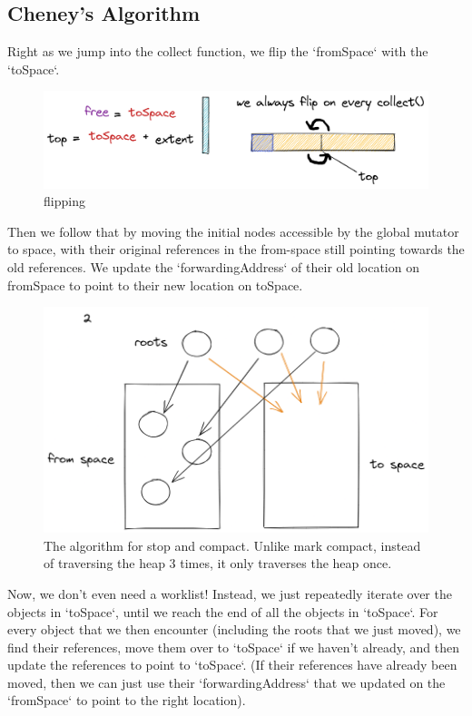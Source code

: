\documentclass[index]{subfiles}
\begin{document}
\subsection{Cheney's Algorithm}

Right as we jump into the collect function, we flip the `fromSpace` with the `toSpace`.

\begin{figure}[H]
    \centering
    \includegraphics[scale=0.3]{pics/flipping.png}
    \caption{flipping}
\end{figure}

Then we follow that by moving the initial nodes accessible by the global mutator to space, with their original references in the from-space still pointing towards the old references. We update the `forwardingAddress` of their old location on fromSpace to point to their new location on toSpace.

\begin{figure}[H]
    \centering
    \includegraphics[scale=0.3]{pics/visualization-of-worklist.png}
    \caption{The algorithm for stop and compact. Unlike mark compact, instead of traversing the heap 3 times, it only traverses the heap once.}
\end{figure}

Now, we don't even need a worklist! Instead, we just repeatedly iterate over the objects in `toSpace`, until we reach the end of all the objects in `toSpace`. For every object that we then encounter (including the roots that we just moved), we find their references, move them over to `toSpace` if we haven't already, and then update the references to point to `toSpace`. (If their references have already been moved, then we can just use their `forwardingAddress` that we updated on the `fromSpace` to point to the right location).
\end{document}
